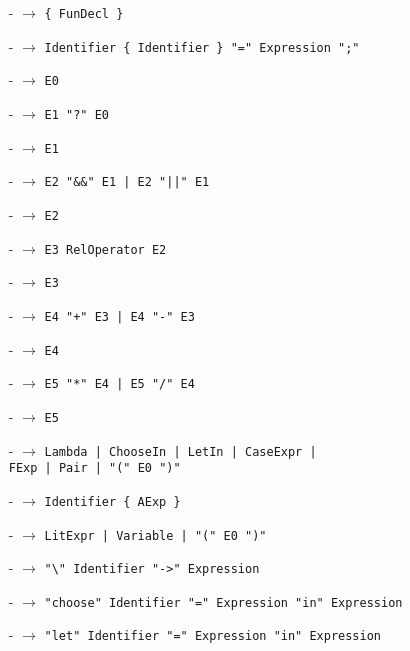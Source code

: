 \documentclass[class=article, crop=false]{standalone}
\begin{document}
\begin{itemize}
  \item[-]{} $\rightarrow$ \verb`{ FunDecl }`
  \item[-]{} $\rightarrow$
  \verb`Identifier { Identifier } "=" Expression ";"`
  
  \item[-]{} $\rightarrow$ \verb`E0`
  \item[-]{} $\rightarrow$ \verb`E1 "?" E0`
  \item[-]{} $\rightarrow$ \verb`E1`
  \item[-]{} $\rightarrow$ \verb`E2 "&&" E1 | E2 "||" E1`
  \item[-]{} $\rightarrow$ \verb`E2`
  \item[-]{} $\rightarrow$ \verb`E3 RelOperator E2`
  \item[-]{} $\rightarrow$ \verb`E3`
  \item[-]{} $\rightarrow$ \verb`E4 "+" E3 | E4 "-" E3`
  \item[-]{} $\rightarrow$ \verb`E4`
  \item[-]{} $\rightarrow$ \verb`E5 "*" E4 | E5 "/" E4`
  \item[-]{} $\rightarrow$ \verb`E5`
  \item[-]{} $\rightarrow$
  \verb`Lambda | ChooseIn | LetIn | CaseExpr |` \\
  \verb`FExp | Pair | "(" E0 ")"`

  \item[-]{} $\rightarrow$ \verb`Identifier { AExp }`
  \item[-]{} $\rightarrow$ \verb`LitExpr | Variable | "(" E0 ")"`
  \item[-]{} $\rightarrow$ \verb`"\" Identifier "->" Expression`
  \item[-]{} $\rightarrow$
  \verb`"choose" Identifier "=" Expression "in" Expression`
  
  \item[-]{} $\rightarrow$
  \verb`"let" Identifier "=" Expression "in" Expression`
  

\end{itemize}
\end{document}
